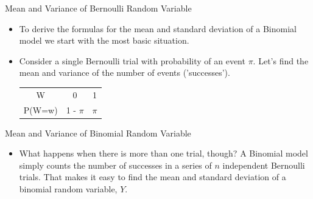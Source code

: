 \documentclass[10pt,handout]{beamer}\usepackage[]{graphicx}\usepackage[]{color}
\begin{document}
\begin{frame}{Mean and Variance of Bernoulli Random Variable}
	\begin{itemize}
		\item To derive the formulas for the mean and standard deviation of a Binomial model we start with
		the most basic situation.
		\item Consider a single Bernoulli trial with probability of an event $\pi$. Let's find the mean and
		variance of the number of events ('successes').
		\begin{tabular}{c|c|c}
			\hline
			W & 0 & 1 \\
			P(W=w) & 1 - $\pi$ & $\pi$ \\
			\hline
		\end{tabular}
	\end{itemize}
\vspace*{1.5in}
	
\end{frame}


\begin{frame}{Mean and Variance of Binomial Random Variable}
	\begin{itemize}
	\item What happens when there is more than one trial, though? A Binomial model simply counts the
	number of successes in a series of $n$ independent Bernoulli trials. That makes it easy to find the
	mean and standard deviation of a binomial random variable, $Y$.
\end{itemize}
\vspace*{1.5in}
\end{frame}
\end{document}
